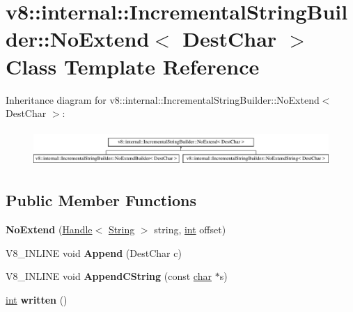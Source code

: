 \hypertarget{classv8_1_1internal_1_1IncrementalStringBuilder_1_1NoExtend}{}\section{v8\+:\+:internal\+:\+:Incremental\+String\+Builder\+:\+:No\+Extend$<$ Dest\+Char $>$ Class Template Reference}
\label{classv8_1_1internal_1_1IncrementalStringBuilder_1_1NoExtend}
Inheritance diagram for v8\+:\+:internal\+:\+:Incremental\+String\+Builder\+:\+:No\+Extend$<$ Dest\+Char $>$\+:\begin{figure}[H]
\begin{center}
\leavevmode
\includegraphics[height=1.389578cm]{classv8_1_1internal_1_1IncrementalStringBuilder_1_1NoExtend}
\end{center}
\end{figure}
\subsection*{Public Member Functions}
\begin{DoxyCompactItemize}
\item 
\mbox{\label{classv8_1_1internal_1_1IncrementalStringBuilder_1_1NoExtend_af7299e1f5cebc06d90ab676b6b4a5f12}} 
{\bfseries No\+Extend} (\mbox{\hyperlink{classv8_1_1internal_1_1Handle}{Handle}}$<$ \mbox{\hyperlink{classv8_1_1internal_1_1String}{String}} $>$ string, \mbox{\hyperlink{classint}{int}} offset)
\item 
\mbox{\label{classv8_1_1internal_1_1IncrementalStringBuilder_1_1NoExtend_a32cd7baa34d13963ce6ae16c9eea9ecf}} 
V8\+\_\+\+I\+N\+L\+I\+NE void {\bfseries Append} (Dest\+Char c)
\item 
\mbox{\label{classv8_1_1internal_1_1IncrementalStringBuilder_1_1NoExtend_a3ed4748ca0acda37b0e9b57fff834285}} 
V8\+\_\+\+I\+N\+L\+I\+NE void {\bfseries Append\+C\+String} (const \mbox{\hyperlink{classchar}{char}} $\ast$s)
\item 
\mbox{\label{classv8_1_1internal_1_1IncrementalStringBuilder_1_1NoExtend_a4e79d84dd6c70ad7eba3e3faa2f2d3e6}} 
\mbox{\hyperlink{classint}{int}} {\bfseries written} ()
\end{DoxyCompactItemize}


